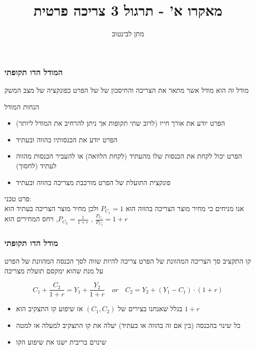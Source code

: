 \documentclass[usenames,dvipsnames]{beamer}
\title[]{{מאקרו א' - תרגול 3 צריכה פרטית}}
\author{\texthebrew{ מתן לבינטוב}}
\institute[{{ אב"ג}}]{{ אוניברסיטת בן גוריון בנגב}}
\date{}
\begin{document}
\begin{RTL}
\begin{frame}
\titlepage
\end{frame}

        

\begin{frame}
    \frametitle{המודל הדו תקופתי}
    מודל זה הוא מודל אשר מתאר את הצריכה והחיסכון של של הפרט כפונקציה של מצב המשק
    \begin{block}{הנחות המודל}
        \begin{itemize}
            \item הפרט יודע את אורך חייו (לרוב שתי תקופות אך ניתן להרחיב את המודל ליותר)
            \item הפרט יודע את הכנסותיו בהווה ובעתיד
            \item הפרט יכול לקחת את הכנסות שלו מהעתיד (לקחת הלוואה) או להעביר הכנסות מהווה לעתיד (לחסוך)
            \item פונקצית התועלת של הפרט מורכבת מצריכה בהווה ובעתיד
        \end{itemize}
    \end{block}
    
    פרט טכני: \\ 
    אנו מניחים כי מחיר מוצר הצריכה בהווה הוא $P_{C_1} = 1$ ולכן מחיר מוצר הצריכה בעתיד הוא $P_{C_2} = \frac{1}{1+r}$, ויחס המחירים הוא , $\frac{P_{C_1}}{P_{C_2}} = 1 + r$ 

\end{frame}

\begin{frame}
    \frametitle{מודל הדו תקופתי}
    \begin{block}{קו התקציב}
        סך הצריכה המהוונת של הפרט צריכה להיות שווה לסך הכנסה המהוונת של הפרט על מנת שהוא ימקסם תועלת מצריכה
        
        $$
        C_1 + \frac{C_2}{1+r} = Y_1 + \frac{Y_2}{1+r} \quad or \quad  C_2 = Y_2 + (Y_1-C_1) \cdot (1+r)
        $$
    \end{block}
    \begin{itemize}
        \item  בגלל שאנחנו בצירים של $(C_1,C_2)$ אז שיפוע קו התצקיב הוא $1+r$ 
        \item כל שינוי בהכנסה (בין אם זה בהווה או בעתיד) יעלה את קו התצקיב למעלה או למטה
        \item שינוים בריבית ישנו את שיפוע הקו
    \end{itemize}


\end{frame}
\end{RTL}
\end{document}
